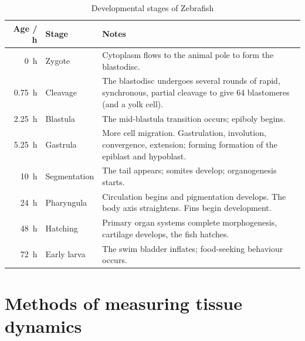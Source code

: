 \begin{table}
  \centering
  \begin{tabular*}{\textwidth}{rlp{23em}}
    \toprule
    Age / \SI{}{\hour}  & Stage & Notes \\
    \midrule
    \SI{0}{\hour} &  Zygote & Cytoplasm flows to the animal pole to form the blastodisc.\\
    \SI{0.75}{\hour} &  Cleavage & The blastodisc undergoes several rounds of rapid, synchronous, partial cleavage to give 64 blastomeres (and a yolk cell).\\
    \SI{2.25}{\hour} &  Blastula & The mid-blastula transition occurs; epiboly begins.\\
    \SI{5.25}{\hour} &  Gastrula & More cell migration. Gastrulation, involution, convergence, extension; forming formation of the epiblast and hypoblast.\\
    \SI{10}{\hour} & Segmentation & The tail appears; somites develop; organogenesis starts. \\
    \SI{24}{\hour} & Pharyngula & Circulation begins and pigmentation develops. The body axis straightens. Fins begin development.\\
    \SI{48}{\hour} & Hatching & Primary organ systems complete morphogenesis, cartilage develops, the fish hatches.\\
    \SI{72}{\hour} & Early larva & The swim bladder inflates; food-seeking behaviour occurs. \\
        \bottomrule
  \end{tabular*}
  \caption{Developmental stages of Zebrafish}
  \label{tab:zfish_dev}
\end{table}

\section{Methods of measuring tissue dynamics}

